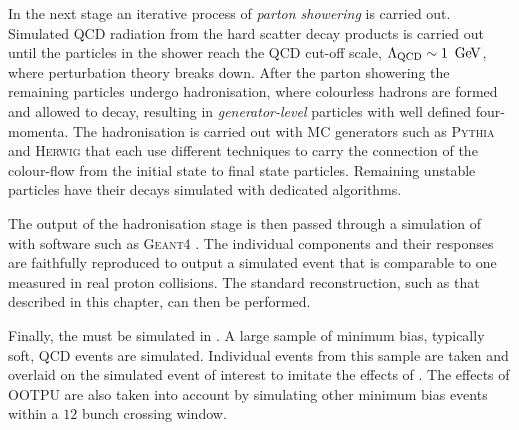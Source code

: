 In the next stage an iterative process of \emph{parton showering} is
carried out. Simulated QCD radiation from the hard scatter decay 
products is carried out until the particles in the shower reach the
QCD cut-off scale, $\Lambda_{\textrm{QCD}}\sim 1~\mathrm{\,Ge\kern -0.1em V}$, where
perturbation theory breaks down. After the parton showering the
remaining particles undergo hadronisation, where colourless hadrons are
formed and allowed to decay, resulting in \emph{generator-level}
particles with well defined four-momenta. The hadronisation is carried
out with MC generators such as \textsc{Pythia} \cite{Sjostrand:2007gs,Sjostrand:2014zea}
and \textsc{Herwig} \cite{Bahr:2008pv} that each use different
techniques to carry the connection of the colour-flow from the initial
state to final state particles. Remaining unstable particles have
their decays simulated with dedicated \MC algorithms.

The output of the hadronisation stage is then passed through a
simulation of \CMS with software such as \textsc{Geant4}
\cite{Agostinelli:2002hh}. The individual components and their
responses are faithfully reproduced to output a simulated event that
is comparable to one measured in real proton collisions. The standard
reconstruction, such as that described in this chapter, can then be
performed.

Finally, the \PU must be simulated in \MC. A large sample of minimum
bias, typically soft, QCD events are simulated. Individual events from
this sample are taken and overlaid on the simulated event of interest
to imitate the effects of \PU. The effects of \acf{OOTPU} are also
taken into account by simulating other minimum bias \MC events within
a $12$ bunch crossing window.

